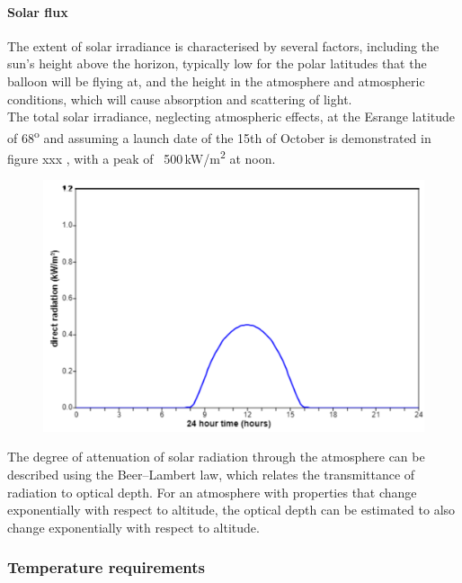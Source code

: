 \paragraph{Solar flux}

The extent of solar irradiance is characterised by several factors, including the sun’s height above the horizon, typically low for the polar latitudes that the balloon will be flying at, and the height in the atmosphere and atmospheric conditions, which will cause absorption and scattering of light. \\
The total solar irradiance, neglecting atmospheric effects, at the Esrange latitude of 68\textsuperscript{o} and assuming a launch date of the 15th of October is demonstrated in figure xxx , with a peak of ~500\,kW/m\textsuperscript{2} at noon.\\

	\begin{figure}[h!]
    \centering
    \includegraphics[scale=0.6]{4-experiment-design/img/mechanical/directradiation.png}
	\label{fig: directradiation}
	\end{figure}

The degree of attenuation of solar radiation through the atmosphere can be described using the Beer–Lambert law, which relates the transmittance of radiation to optical depth. For an atmosphere with properties that change exponentially with respect to altitude, the optical depth can be estimated to also change exponentially with respect to altitude. \


\subsubsection{Temperature requirements}

